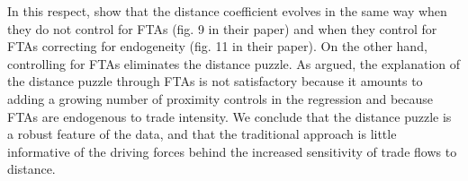 \documentclass[12pt,twoside,a4paper,notitlepage]{article}
\begin{document}
In this respect, \cite{Bosquet2015} show that the distance coefficient evolves in the same way when they do not control for FTAs (fig.
9 in their paper) and when they control for FTAs correcting for endogeneity (fig.
11 in their paper).
On the other hand, controlling for FTAs eliminates the distance puzzle.
As argued, the explanation of the distance puzzle through FTAs is not satisfactory because it amounts to adding a growing number of proximity controls in the regression and because FTAs are endogenous to trade intensity.
We conclude that the distance puzzle is a robust feature of the data, and that the traditional approach is little informative of the driving forces behind the increased sensitivity of trade flows to distance.
 
\fi

\end{document}
